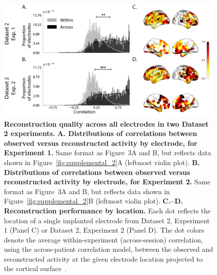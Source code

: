 \documentclass[10pt]{article}
\begin{document}
\begin{figure}[p]
\centering
\includegraphics[width=\textwidth]{figs/supplemental_3}
\caption{\textbf{Reconstruction quality across all electrodes in two
      Dataset 2 experiments.}  \textbf{A. Distributions of correlations
      between observed versus reconstructed activity by electrode, for
      Experiment 1.}  Same format as Figure~3A and B, but reflects data shown
    in Figure~\ref{fig:supplemental_2}A (leftmost violin plot).
 \textbf{B. Distributions of correlations
      between observed versus reconstructed activity by electrode, for
      Experiment 2.}  Same format as Figure~3A and B, but reflects
    data shown in Figure~\ref{fig:supplemental_2}B (leftmost violin
    plot).  \textbf{C.--D.  Reconstruction
      performance by location.} Each dot reflects the location of a
    single implanted electrode from Dataset 2, Experiment 1 (Panel C)
    or Dataset 2, Experiment 2 (Panel D).  The dot colors denote the
    average within-experiment (across-session)
    correlation, using the across-patient correlation model, between
    the observed and reconstructed activity at the given electrode
    location projected to the cortical surface~\citep{CombEtal19}.}
\label{fig:supplemental_3}
\end{figure}
\end{document}
